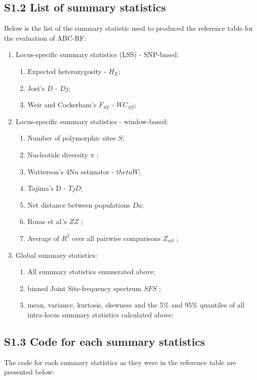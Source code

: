 \documentclass[12pt]{article}
\begin{document}
\subsection*{S1.2 List of summary statistics}

Below is the list of the summary statistic used to produced the reference table for the evaluation of ABC-RF:
\begin{enumerate}
	\item Locus-specific summary statistics (LSS) - SNP-based:
    \begin{enumerate}
    	\item Expected heterozygosity - $H_E$;
        \item Jost's $D$ \citep{Jost:2008cs,Jost:2009hn} - $Dj$;
        \item Weir and Cockerham's $F_{ST}$ \citep{Weir:1984dx} - $WC_{ST}$;
    \end{enumerate}
    \item Locus-specific summary statistics - window-based:
    \begin{enumerate}
        \item Number of polymorphic sites $S$;
        \item Nucleotide diversity $\pi$ \citep{Nei:1979uk};
        \item Watterson's 4Nu estimator \citep{Watterson:1975bh} - $thetaW$;
        \item Tajima's D \citep{Tajima:1989un} - $TjD$;
        \item Net distance between populations $Da$;
        \item Rozas et al.'s $ZZ$ \citep{Rozas:2001wc};
        \item Average of $R^2$ over all pairwise comparisons $Z_{nS}$ \citep{Kelly:1997uja}; 
    \end{enumerate}
    \item Global summary statistics:
    \begin{enumerate}
        \item All summary statistics enumerated above;
        \item binned Joint Site-frequency spectrum $SFS$ \citep{Ewing:2016gv};
        \item mean, variance, kurtosis, skewness and the 5\% and 95\% quantiles of all intra-locus summary statistics calculated above;
    \end{enumerate}
\end{enumerate}

\subsection*{S1.3 Code for each summary statistics}
The code for each summary statistics as they were in the reference table are presented below:
\end{document}
